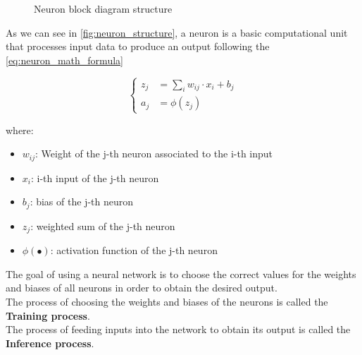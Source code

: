 \begin{figure}[h!]
\begin{center}

    \end{center}

    \caption{Neuron block diagram structure}
    \label{fig:neuron_structure}

\end{figure}

\noindent
As we can see in \autoref{fig:neuron_structure}, a neuron is a basic computational unit that processes input data to produce an output following the \cref{eq:neuron_math_formula}

\begin{equation}
    \begin{cases}
        z_j &= \sum_i w_{ij} \cdot x_i + b_j \\
        a_j &= \phi(z_j)
    \end{cases}
    \label{eq:neuron_math_formula}
\end{equation}

\noindent
where:

\begin{itemize}
    \setlength\itemsep{0pt}
    \setlength\parskip{0pt}
    \item \(w_{ij}\): Weight of the j-th neuron associated to the i-th input
    \item \(x_i\): i-th input of the j-th neuron
    \item \(b_j\): bias of the j-th neuron
    \item \(z_j\): weighted sum of the j-th neuron
    \item \(\phi(\bullet)\): activation function of the j-th neuron
\end{itemize}

\noindent
The goal of using a neural network is to choose the correct values for the weights and biases of all neurons in order to obtain the desired output. \\
The process of choosing the weights and biases of the neurons is called the \textbf{Training process}. \\
The process of feeding inputs into the network to obtain its output is called the \textbf{Inference process}.

